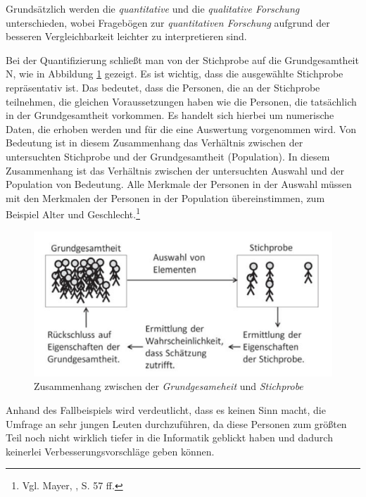 Grundsätzlich werden die \textit{quantitative} und die \textit{qualitative Forschung} unterschieden, wobei Fragebögen zur
\textit{quantitativen Forschung} aufgrund der besseren Vergleichbarkeit leichter zu interpretieren sind.

Bei der Quantifizierung schließt man von der Stichprobe auf die Grundgesamtheit N, wie in Abbildung \ref{fig:GrundgesamtheitStichprobe}
gezeigt. Es ist wichtig, dass die ausgewählte Stichprobe repräsentativ ist. Das bedeutet, dass die Personen, die an der
Stichprobe teilnehmen, die gleichen Voraussetzungen haben wie die Personen, die tatsächlich in der Grundgesamtheit vorkommen.
Es handelt sich hierbei um numerische Daten, die erhoben werden und für die eine Auswertung vorgenommen wird. Von Bedeutung
ist in diesem Zusammenhang das Verhältnis zwischen der untersuchten Stichprobe und der Grundgesamtheit (Population). In
diesem Zusammenhang ist das Verhältnis zwischen der untersuchten Auswahl und der Population von Bedeutung. Alle Merkmale
der Personen in der Auswahl müssen mit den Merkmalen der Personen in der Population übereinstimmen, zum Beispiel Alter
und Geschlecht.\footnote{Vgl. Mayer, \cite{Interview und schriftliche Befragung}, S. 57 ff.}

\begin{figure}[h]
    \centering
    \includegraphics[width=1\textwidth]{images/zsmhGrundStich}
    \caption{Zusammenhang zwischen der \textit{Grundgesameheit} und \textit{Stichprobe}}
    \label{fig:GrundgesamtheitStichprobe}
\end{figure}

Anhand des Fallbeispiels wird verdeutlicht, dass es keinen Sinn macht, die Umfrage an sehr jungen Leuten durchzuführen,
da diese Personen zum größten Teil noch nicht wirklich tiefer in die Informatik geblickt haben und dadurch keinerlei
Verbesserungsvorschläge geben können.

